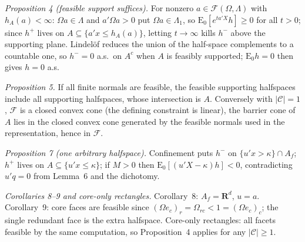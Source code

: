 \documentclass[12pt]{article}
\theoremstyle{remark}
\newcommand{\E}{\mathrm E}
\newcommand{\R}{\mathbf R}
\newcommand{\cC}{\mathcal C}
\newcommand{\cF}{\mathcal F}
\begin{document}
\emph{Proposition 4 (feasible support suffices).} For nonzero
$a\in\cF(\Omega,\Lambda)$ with $h_A(a)<\infty$: $\Omega a\in\Lambda$ and
$a'\Omega a>0$ put $\Omega a\in\Lambda_1$, so
$\E_0[e^{ta'X}h]\ge0$ for all $t>0$; since $h^+$ lives on
$A\subseteq\{a'x\le h_A(a)\}$, letting $t\to\infty$ kills
$h^-$ above the supporting plane. Lindel\"of reduces the union of the
half-space complements to a countable one, so $h^-=0$ a.s.\ on $A^c$ when
$A$ is feasibly supported; $\E_0h=0$ then gives $h=0$ a.s.

\emph{Proposition 5.} If all finite normals are feasible, the feasible
supporting halfspaces include all supporting halfspaces, whose intersection
is $A$. Conversely with $|\cC|=1$, $\cF$ is a closed convex cone (the
defining constraint is linear), the barrier cone of $A$ lies in the closed
convex cone generated by the feasible normals used in the representation,
hence in $\cF$.

\emph{Proposition 7 (one arbitrary halfspace).} Confinement puts $h^-$ on
$\{u'x>\kappa\}\cap A_f$; $h^+$ lives on $A\subseteq\{u'x\le\kappa\}$; if
$M>0$ then $\E_0[(u'X-\kappa)h]<0$, contradicting $u'q=0$ from Lemma~6 and
the dichotomy.

\emph{Corollaries 8--9 and core-only rectangles.} Corollary~8: $A_f=\R^d$,
$u=a$. Corollary~9: core faces are feasible since
$(\Omega e_c)_r=\Omega_{rc}<1=(\Omega e_c)_c$; the single redundant face is
the extra halfspace. Core-only rectangles: all facets feasible by the same
computation, so Proposition~4 applies for any $|\cC|\ge1$.
\end{document}
